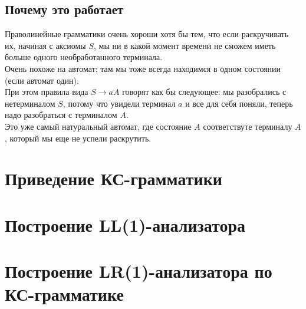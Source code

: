 \documentclass[14pt]{extreport}
\begin{document}
	\section{Почему это работает}
	Праволинейные грамматики очень хороши хотя бы тем, что если раскручивать их, начиная
	с аксиомы $S$, мы ни в какой момент времени не сможем иметь больше одного
	необработанного терминала.\\
	Очень похоже на автомат: там мы тоже всегда находимся в одном состоянии (если
	автомат один).\\
	При этом правила вида $S \to aA$ говорят как бы следующее: мы разобрались с нетерминалом
	$S$, потому что увидели терминал $a$ и все для себя поняли, теперь надо 
	разобраться с терминалом $A$.\\
	Это уже самый натуральный автомат, где состояние $A$ соответствуте терминалу $A$, который
	мы еще не успели раскрутить.
	
	
	\chapter{Приведение КС-грамматики}
	\chapter{Построение LL(1)-анализатора}
	\chapter{Построение LR(1)-анализатора по КС-грамматике}
	
	
	
	
\end{document}
